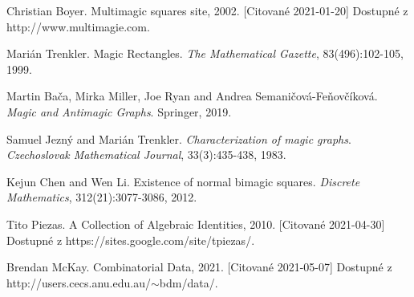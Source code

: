 \documentclass[12pt, twoside]{book}
\begin{document}
\begin{thebibliography}{7}
 Christian Boyer. Multimagic squares site, 2002. [Citované 2021-01-20] Dostupné z http://www.multimagie.com.

 Marián Trenkler. Magic Rectangles. \textit{The Mathematical Gazette}, 83(496):102-105, 1999.

 Martin Bača, Mirka Miller, Joe Ryan and Andrea Semaničová-Feňovčíková. \textit{Magic and Antimagic Graphs}. Springer, 2019.

 Samuel Jezný and Marián Trenkler. \textit{Characterization of magic graphs}. \textit{Czechoslovak Mathematical Journal}, 33(3):435-438, 1983.

 Kejun Chen and Wen Li. Existence of normal bimagic squares. \textit{Discrete Mathematics}, 312(21):3077-3086, 2012.

 Tito Piezas. A Collection of Algebraic Identities, 2010. [Citované 2021-04-30] Dostupné z https://sites.google.com/site/tpiezas/.

 Brendan McKay. Combinatorial Data, 2021. [Citované 2021-05-07] Dostupné z http://users.cecs.anu.edu.au/$\sim$bdm/data/.
\end{thebibliography}



%


%
\end{document}

